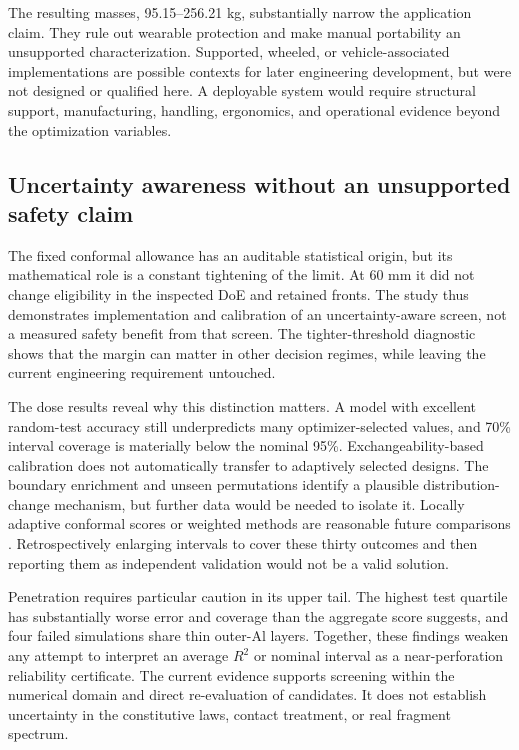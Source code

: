 The resulting masses, 95.15--256.21 kg, substantially narrow the application claim. They rule out wearable protection and make manual portability an unsupported characterization. Supported, wheeled, or vehicle-associated implementations are possible contexts for later engineering development, but were not designed or qualified here. A deployable system would require structural support, manufacturing, handling, ergonomics, and operational evidence beyond the optimization variables.

\subsection{Uncertainty awareness without an unsupported safety claim}
The fixed conformal allowance has an auditable statistical origin, but its mathematical role is a constant tightening of the limit. At 60 mm it did not change eligibility in the inspected DoE and retained fronts. The study thus demonstrates implementation and calibration of an uncertainty-aware screen, not a measured safety benefit from that screen. The tighter-threshold diagnostic shows that the margin can matter in other decision regimes, while leaving the current engineering requirement untouched.

The dose results reveal why this distinction matters. A model with excellent random-test accuracy still underpredicts many optimizer-selected values, and 70\% interval coverage is materially below the nominal 95\%. Exchangeability-based calibration does not automatically transfer to adaptively selected designs. The boundary enrichment and unseen permutations identify a plausible distribution-change mechanism, but further data would be needed to isolate it. Locally adaptive conformal scores or weighted methods are reasonable future comparisons \cite{Romano2019CQR,Tibshirani2019Shift}. Retrospectively enlarging intervals to cover these thirty outcomes and then reporting them as independent validation would not be a valid solution.

Penetration requires particular caution in its upper tail. The highest test quartile has substantially worse error and coverage than the aggregate score suggests, and four failed simulations share thin outer-Al layers. Together, these findings weaken any attempt to interpret an average $R^2$ or nominal interval as a near-perforation reliability certificate. The current evidence supports screening within the numerical domain and direct re-evaluation of candidates. It does not establish uncertainty in the constitutive laws, contact treatment, or real fragment spectrum.


